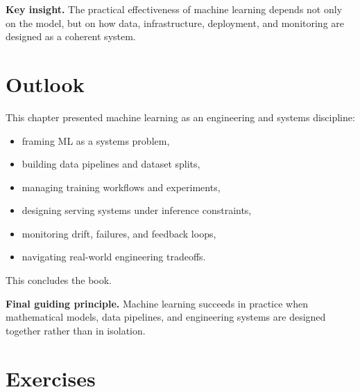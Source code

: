 \medskip

\noindent
\textbf{Key insight.}
The practical effectiveness of machine learning depends not only on the model, but on how data, infrastructure, deployment, and monitoring are designed as a coherent system.

\section{Outlook}

This chapter presented machine learning as an engineering and systems discipline:
\begin{itemize}
    \item framing ML as a systems problem,
    \item building data pipelines and dataset splits,
    \item managing training workflows and experiments,
    \item designing serving systems under inference constraints,
    \item monitoring drift, failures, and feedback loops,
    \item navigating real-world engineering tradeoffs.
\end{itemize}

\medskip

This concludes the book.

\medskip

\noindent
\textbf{Final guiding principle.}
Machine learning succeeds in practice when mathematical models, data pipelines, and engineering systems are designed together rather than in isolation.

\section*{Exercises}

